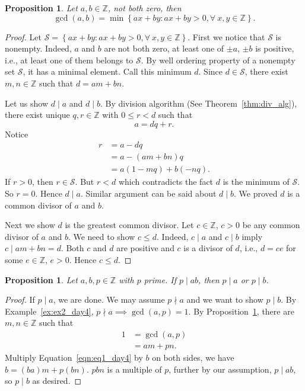 \documentclass{amsbook}
\theoremstyle{plain}
\newtheorem{proposition}[theorem]{Proposition}
\theoremstyle{definition}
\theoremstyle{remark}
\numberwithin{equation}{chapter}
\numberwithin{figure}{chapter}
\begin{document}
\begin{proposition}\label{prop:gcd_min_lin}
Let $a, b \in \mathbb{Z}$, not both zero, then 
\[
\gcd(a, b) = \min \left\{ ax + by : ax + by >0, \forall~ x, y \in \mathbb{Z} \right\}.
\]
\end{proposition}
\begin{proof}
Let $\mathcal{S} = \left\{ ax + by : ax + by >0, \forall~ x, y \in \mathbb{Z} \right\}$. First we notice that $\mathcal{S}$ is nonempty. Indeed, $a$ and $b$ are not both zero, at least one of $\pm a$, $\pm b$ is positive, i.e., at least one of them belongs to $\mathcal{S}$. By well ordering property of a nonempty set $\mathcal{S}$, it has a minimal element. Call this minimum $d$. Since $d \in \mathcal{S}$, there exist $m, n \in \mathbb{Z}$ such that $d = am + bn$.

Let us show $d \mid a$ and $d \mid b$. By division algorithm (See Theorem~\ref{thm:div_alg}), there exist unique $q, r \in \mathbb{Z}$ with $0 \leqslant r < d$ such that 
\[
a = dq + r.
\] 
Notice 
\begin{align}
r &= a - dq \\
  &= a - (am + bn)q \\
  &= a(1-mq) + b(-nq). 
\end{align}
If $r > 0$, then $r \in \mathcal{S}$. But $r < d$ which contradicts the fact $d$ is the minimum of $\mathcal{S}$. So $r = 0$. Hence $d \mid a$. Similar argument can be said about $d \mid b$. We proved $d$ is a common divisor of $a$ and $b$.

Next we show $d$ is the greatest common divisor. Let $c \in \mathbb{Z}$, $c > 0$ be any common divisor of $a$ and $b$. We need to show $c \leqslant d$. Indeed, $c \mid a$ and $c \mid b$ imply $c \mid am + bn = d$. Both $c$ and $d$ are positive and $c$ is a divisor of $d$, i.e., $d = ce$ for some $e \in \mathbb{Z}$, $e > 0$. Hence $c \leqslant d$.
\end{proof}

\begin{proposition}\label{prop:p_div}
Let $a, b, p \in \mathbb{Z}$ with $p$ prime. If $p \mid ab$, then $p \mid a$ or $p \mid b$.
\end{proposition}
\begin{proof}
If $p \mid a$, we are done. We may assume $p \nmid a$ and we want to show $p \mid b$. By Example~\ref{ex:ex2_day4}, $p \nmid a \implies \gcd(a, p) = 1$. By Proposition~\ref{prop:gcd_min_lin}, there are $m, n \in \mathbb{Z}$ such that
\begin{equation}\label{eqn:eq1_day4}
\begin{split}
1 &= \gcd(a, p) \\
  &= am + pn. 
\end{split}
\end{equation}
Multiply Equation~\eqref{eqn:eq1_day4} by $b$ on both sides, we have $b = (ba)m + p(bn)$. $pbn$ is a multiple of $p$, further by our assumption, $p \mid ab$, so $p \mid b$ as desired. 
\end{proof}
\end{document}
